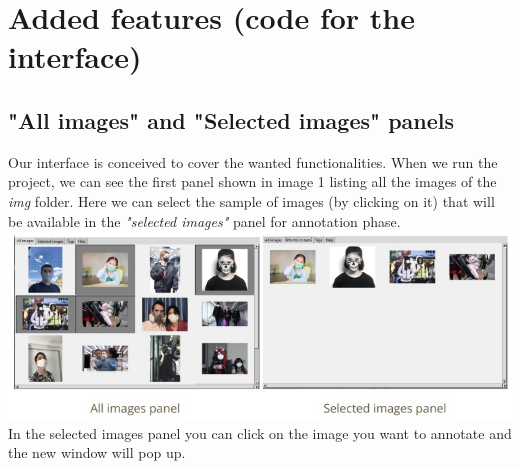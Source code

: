 \documentclass[a4paper, 11pt]{article}
\begin{document}
\section{Added features (code for the interface)}
\subsection{"All images" and "Selected images" panels} 
Our interface is conceived to cover the wanted functionalities. When we run the project, we can see the first panel shown in image 1 listing all the images of the \textit{img} folder.
Here we can select the sample of images (by clicking on it) that will be available in the \textit{"selected images"} panel for annotation phase. 
\includegraphics[scale=0.8]{images_latex/images_panel.jpg}
In the selected images panel you can click on the image you want to annotate and the new window will pop up. 
\end{document}
